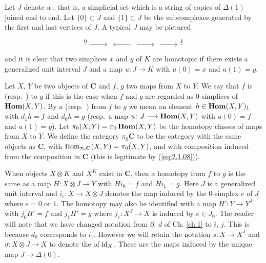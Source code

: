 \documentclass[../main]{subfiles}
\begin{document}
Let $J$ denote a , that is, a simplicial set which is a string of copies of $\Delta(1)$ joined end to end. Let $\{0\} \subset J$ and $\{1\} \subset J$ be the subcomplexes generated by the first and last vertices of $J$. A typical $J$ may be pictured 
\[
\begin{tikzcd}
    \stackrel0. 
    \arrow[r]
    &
    {}
    &
    {}
    \arrow[l]
    \arrow[r]
    &
    {}
    \arrow[r]
    &
    \stackrel1.
\end{tikzcd}
\]
and it is clear that two simplices $x$ and $y$ of $K$ are homotopic if there exists a generalized unit interval $J$ and a map $u \colon J \longrightarrow K$ with $u(0) = x$ and $u(1) = y$. 

\begin{definition}
\label{def:2.1.04}
Let $X$, $Y$ be two objects of $\mathbf C$ and $f$, $g$ two maps from $X$ to $Y$. We say that $f$ is  (resp.\ ) to $g$ if this is the case when $f$ and $g$ are regarded as $0$-simplices of $\operatorname{\mathbf{Hom}}(X,Y)$. By a  (resp.\ ) from $f$ to $g$ we mean an element $h \in \operatorname{\mathbf{Hom}}(X,Y)_1$ with $d_1 h = f$ and $d_0 h = g$ (resp.\ a map $u \colon J \longrightarrow \operatorname{\mathbf{Hom}}(X, Y)$ with $u(0) = f$ and $u(1) = g$). Let $\pi_0(X, Y) = \pi_0\operatorname{\mathbf{Hom}}(X,Y)$ be the homotopy classes of maps from $X$ to $Y$. We define the category $\pi_0\mathbf C$ to be the category with the same objects as $\mathbf C$, with $\operatorname{Hom}_{\pi_0\mathbf C} (X, Y) = \pi_0(X,Y)$, and with composition induced from the composition in $\mathbf C$ (this is legitimate by (\ref{eq:2.1.08})).
\end{definition}

When objects $X \otimes K$ and $X^K$ exist in $\mathbf C$, then a homotopy from $f$ to $g$ is the same as a map $H \colon X \otimes J \longrightarrow Y$ with $Hi_0 = f$ and $Hi_1 = g$. Here $J$ is a generalized unit interval and $i_e \colon X \longrightarrow X \otimes J$ denotes the map induced by the 0-simplex $e$ of $J$ where $e = 0$ or $1$. The homotopy may also be identified with a map $H' \colon Y \longrightarrow Y^J$ with $j_0H' = f$ and $j_1H' = g$ where $j_e \colon X^J \longrightarrow X$ is induced by $e \in J_0$. The reader will note that we have changed notation from $\partial$, $d$ of Ch. \ref{ch:1} to $i$, $j$. This is because $d_0$ corresponds to $i_1$. However we will retain the notation $s \colon X \longrightarrow X^J$ and $\sigma \colon X \otimes J \longrightarrow X$ to denote the  of $\operatorname{id}_X$. These are the maps induced by the unique map $J \longrightarrow \Delta(0)$. 
\end{document}
